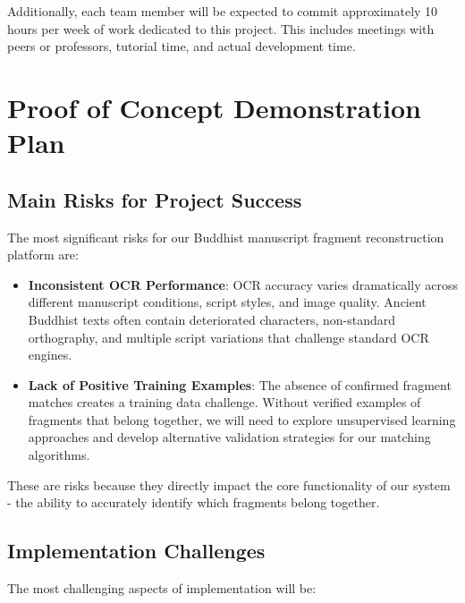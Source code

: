 \documentclass{article}
\begin{document}
\noindent
Additionally, each team member will be expected to commit approximately 10 hours per week of work dedicated to this project. This includes meetings with peers or professors, tutorial time, and actual development time.


\section{Proof of Concept Demonstration Plan}

\subsection{Main Risks for Project Success}

The most significant risks for our Buddhist manuscript fragment reconstruction platform are:

\begin{itemize}
\item \textbf{Inconsistent OCR Performance}: OCR accuracy varies dramatically across different manuscript conditions, script styles, and image quality. Ancient Buddhist texts often contain deteriorated characters, non-standard orthography, and multiple script variations that challenge standard OCR engines.


\item \textbf{Lack of Positive Training Examples}: The absence of confirmed fragment matches creates a training data challenge. Without verified examples of fragments that belong together, we will need to explore unsupervised learning approaches and develop alternative validation strategies for our matching algorithms.
\end{itemize}

These are risks because they directly impact the core functionality of our system - the ability to accurately identify which fragments belong together.

\subsection{Implementation Challenges}

The most challenging aspects of implementation will be:
\end{document}
